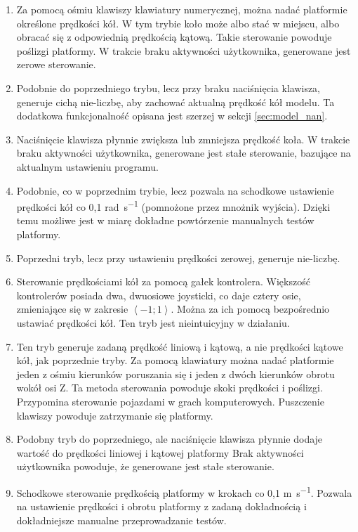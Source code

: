 		\begin{enumerate}
			\item Za pomocą ośmiu klawiszy klawiatury numerycznej, można nadać platformie określone prędkości kół.
			W tym trybie koło może albo stać w miejscu, albo obracać się z odpowiednią prędkością kątową.
			Takie sterowanie powoduje poślizgi platformy. W trakcie braku aktywności użytkownika, generowane jest zerowe sterowanie.
			\item Podobnie do poprzedniego trybu, lecz przy braku naciśnięcia klawisza, generuje cichą nie-liczbę, aby zachować aktualną prędkość kół modelu.
			Ta dodatkowa funkcjonalność opisana jest szerzej w sekcji \ref{sec:model_nan}.
			\item Naciśnięcie klawisza płynnie zwiększa lub zmniejsza prędkość koła. W trakcie braku aktywności użytkownika, generowane jest stałe sterowanie, bazujące na aktualnym ustawieniu programu.
			\item Podobnie, co w poprzednim trybie, lecz pozwala na schodkowe ustawienie prędkości kół co 0,1 \si{\radian\per\second} (pomnożone przez mnożnik wyjścia).
			Dzięki temu możliwe jest w miarę dokładne powtórzenie manualnych testów platformy.
			\item Poprzedni tryb, lecz przy ustawieniu prędkości zerowej, generuje nie-liczbę.
			\item Sterowanie prędkościami kół za pomocą gałek kontrolera.
			Większość kontrolerów posiada dwa, dwuosiowe joysticki, co daje cztery osie, zmieniające się w zakresie $\left<-1;1\right>$.
			Można za ich pomocą bezpośrednio ustawiać prędkości kół. Ten tryb jest nieintuicyjny w działaniu.
			\item Ten tryb generuje zadaną prędkość liniową i kątową, a nie prędkości kątowe kół, jak poprzednie tryby.
			Za pomocą klawiatury można nadać platformie jeden z ośmiu kierunków poruszania się i jeden z dwóch kierunków obrotu wokół osi Z.
			Ta metoda sterowania powoduje skoki prędkości i poślizgi. Przypomina sterowanie pojazdami w grach komputerowych.
			Puszczenie klawiszy powoduje zatrzymanie się platformy.
			\item Podobny tryb do poprzedniego, ale naciśnięcie klawisza płynnie dodaje wartość do prędkości liniowej i kątowej platformy
			Brak aktywności użytkownika powoduje, że generowane jest stałe sterowanie.
			\item Schodkowe sterowanie prędkością platformy w krokach co 0,1 \si{\metre\per\second}. Pozwala na ustawienie prędkości i obrotu platformy z zadaną dokładnością
			i dokładniejsze manualne przeprowadzanie testów.

\end{enumerate}
